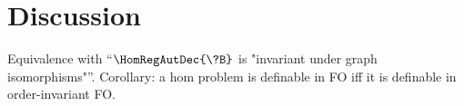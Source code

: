\section{\AP\label{sec:dichotomy-discussion}%
	Discussion}

Equivalence with ``$\HomRegAutDec{\?B}$ is "invariant under graph isomorphisms"''.
Corollary: a hom problem is definable in FO iff it is definable in order-invariant FO.